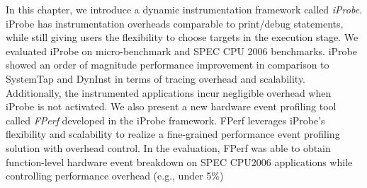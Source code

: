 In this chapter, we introduce a dynamic instrumentation framework called \emph{iProbe}.
iProbe has instrumentation overheads comparable to print/debug statements, while still giving users the flexibility to choose targets in the execution stage. 
We evaluated iProbe on micro-benchmark and SPEC CPU 2006 benchmarks.
iProbe showed an order of magnitude performance improvement in comparison to SystemTap\cite{utrace} and DynInst\cite{dyninst} in terms of tracing overhead and scalability.
Additionally, the instrumented applications incur negligible overhead when iProbe is not activated.
We also present a new hardware event profiling tool called \emph{FPerf} developed in the iProbe framework.  
FPerf leverages iProbe's flexibility and scalability to realize a fine-grained performance event profiling solution with overhead control.
In the evaluation, FPerf was able to obtain function-level hardware event breakdown on SPEC CPU2006 applications while controlling performance overhead (e.g., under 5\%)




